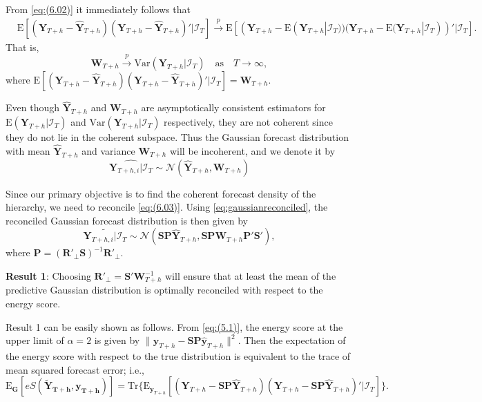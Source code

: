 \documentclass[a4paper, 11pt]{article}
\def\E{\text{E}}
\begin{document}
From \eqref{eq:(6.02)} it immediately follows that
\begin{align*}
&\E[(\bm{Y}_{T+h} - \hat{\bm{Y}}_{T+h})(\bm{Y}_{T+h} - \hat{\bm{Y}}_{T+h})'|\bm{\mathcal{I}}_T] \overset{p}{\to} \E[(\bm{Y}_{T+h} - \E(\bm{Y}_{T+h}|\bm{\mathcal{I}}_T))(\bm{Y}_{T+h} - \E(\bm{Y}_{T+h}|\bm{\mathcal{I}}_T))'|\bm{\mathcal{I}}_T].
\end{align*}
That is,
\begin{equation}
\bm{W}_{T+h} \overset{p}{\to} \text{Var}(\bm{Y}_{T+h}|\bm{\mathcal{I}}_T) \quad \text{as} \quad T \to \infty,
\end{equation}
where $\E[(\bm{Y}_{T+h} - \hat{\bm{Y}}_{T+h})(\bm{Y}_{T+h} - \hat{\bm{Y}}_{T+h})'|\bm{\mathcal{I}}_T] = \bm{W}_{T+h}$.

Even though $\hat{\bm{Y}}_{T+h}$ and $\bm{W}_{T+h}$ are asymptotically consistent estimators for $\E(\bm{Y}_{T+h}|\bm{\mathcal{I}}_T)$ and $\text{Var}(\bm{Y}_{T+h}|\bm{\mathcal{I}}_T)$ respectively, they are not coherent since they do not lie in the coherent subspace. Thus the Gaussian forecast distribution with mean $\hat{\bm{Y}}_{T+h}$ and variance $\bm{W}_{T+h}$ will be incoherent, and we denote it by
\begin{equation}\label{eq:(6.03)}
\widehat{\bm{Y}_{T+h,i}|\bm{\mathcal{I}}_T} \sim \mathcal{N}(\hat{\bm{Y}}_{T+h}, \bm{W}_{T+h})
\end{equation}

Since our primary objective is to find the coherent forecast density of the hierarchy, we need to reconcile \eqref{eq:(6.03)}. Using \eqref{eq:gaussianreconciled}, the reconciled Gaussian forecast distribution is then given by
\begin{equation}\label{eq:(6.04)}
\widetilde{\bm{Y}_{T+h,i}|\bm{\mathcal{I}}_T} \sim \mathcal{N}(\bm{SP}\hat{\bm{Y}}_{T+h}, \bm{SP}\bm{W}_{T+h}\bm{P}'\bm{S}'),
\end{equation}
where $\bm{P} = (\bm{R}'_\bot \bm{S})^{-1}\bm{R}'_\bot$.

\textbf{Result 1}: Choosing $\bm{R}'_\bot = \bm{S}'\bm{W}_{T+h}^{-1}$ will ensure that at least the mean of the predictive Gaussian distribution is optimally reconciled with respect to the energy score.

Result 1 can be easily shown as follows. From \eqref{eq:(5.1)}, the energy score at the upper limit of $\alpha=2$ is given by $\|\bm{y}_{T+h}-\bm{SP}\hat{\bm{y}}_{T+h}\|^2$. Then the expectation of the energy score with respect to the true distribution is equivalent to the trace of mean squared forecast error; i.e.,
$$
\E_{\bm{G}}[eS(\bm{\tilde{Y}_{T+h},y_{T+h}})]= \text{Tr}\{\E_{\bm{y}_{T+h}}[(\bm{Y}_{T+h}-\bm{SP}\hat{\bm{Y}}_{T+h})(\bm{Y}_{T+h}-\bm{SP}\hat{\bm{Y}}_{T+h})'|\mathcal{I}_{T}]\}.
$$
\end{document}
